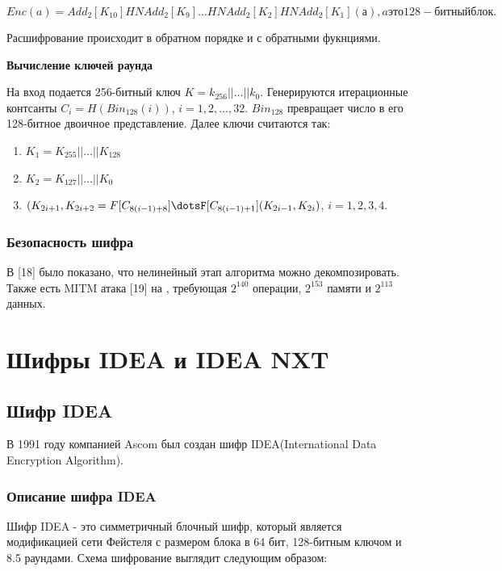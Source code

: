 \documentclass[colorthm]{./civarticle}
\begin{document}
\begin{equation}
    Enc(a) = Add_2[K_10]HNAdd_2[K_9]\dots HNAdd_2[K_2]HNAdd_2[K_1](а), a это 128-битный блок.
\end{equation}

Расшифрование происходит в обратном порядке и с обратными фукнциями. 

\textbf{Вычисление ключей раунда}

На вход подается 256-битный ключ $K = k_{256}||\dots||k_0$. Генерируются итерационные контсанты $C_i=H(Bin_{128}(i))$, $i = 1, 2, \dots, 32$. $Bin_{128}$ превращает число в его 128-битное двоичное представление. Далее ключи считаются так:

\begin{enumerate}
    \item $K_1 = K_{255}||\dots||K_{128}$
    \item $K_2 = K_{127}||\dots||K_{0}$
    \item $(K_{2i+1}, K_{2i+2} = F[C_{8(i-1)+8}]\dotsF[C_{8(i-1)+1}](K_{2i-1}, K_{2i})$, $i=1,2,3,4$.
\end{enumerate}

\subsubsection{Безопасность шифра}

В [18] было показано, что нелинейный этап алгоритма можно декомпозировать. Также есть MITM атака [19] на \textquotedbl, требующая $2^{140}$ операции, $2^{153}$ памяти и $2^{113}$ данных.

\section{Шифры IDEA и IDEA NXT}

\subsection{Шифр IDEA}
В 1991 году компанией Ascom был создан шифр IDEA(International Data Encryption Algorithm).

\subsubsection{Описание шифра IDEA}

Шифр IDEA - это симметричный блочный шифр, который является модификацией сети Фейстеля с размером блока в 64 бит, 128-битным ключом и 8.5 раундами. Схема шифрование выглядит следующим образом:
\end{document}
